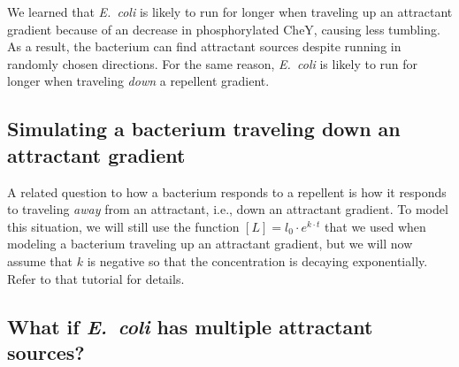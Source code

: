 We learned that \textit{E.~coli} is likely to run for longer when traveling up an attractant gradient because of an decrease in phosphorylated CheY, causing less tumbling. As a result, the bacterium can find attractant sources despite running in randomly chosen directions. For the same reason, \textit{E.~coli} is likely to run for longer when traveling \textit{down} a repellent gradient.\\

\begin{exercise}\end{exercise}

\subsection{Simulating a bacterium traveling down an attractant gradient}

A related question to how a bacterium responds to a repellent is how it responds to traveling \textit{away} from an attractant, i.e., down an attractant gradient. To model this situation, we will still use the function $[L] = l_0 \cdot e^{k \cdot t}$ that we used when modeling a bacterium traveling up an attractant gradient, but we will now assume that $k$ is negative so that the concentration is decaying exponentially. Refer to that tutorial for details.\\

\begin{exercise}\end{exercise}

\subsection{What if \textit{E.~coli} has multiple attractant sources?}

